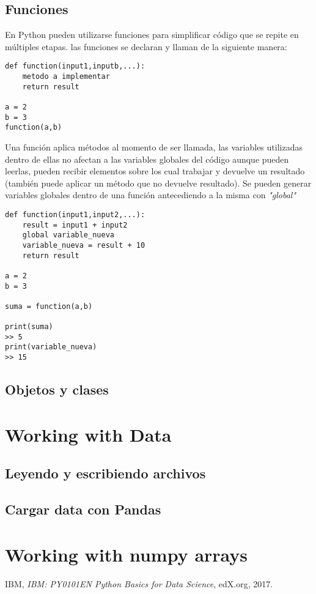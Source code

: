 \documentclass[10pt,a4paper]{article}
\begin{document}
\subsection{Funciones}
En Python pueden utilizarse funciones para simplificar código que se repite en múltiples etapas. las funciones se declaran y llaman de la siguiente manera:

\begin{lstlisting}
def function(input1,inputb,...):
    metodo a implementar
    return result

a = 2
b = 3
function(a,b)
\end{lstlisting} 

\noindent Una función aplica métodos al momento de ser llamada, las variables utilizadas dentro de ellas no afectan a las variables globales del código aunque pueden leerlas, pueden recibir elementos sobre los cual trabajar y devuelve un resultado (también puede aplicar un método que no devuelve resultado). Se pueden generar variables globales dentro de una función antecediendo a la misma con \emph{"global"}

\begin{lstlisting}
def function(input1,input2,...):
    result = input1 + input2
    global variable_nueva
    variable_nueva = result + 10    
    return result

a = 2
b = 3

suma = function(a,b)

print(suma)
>> 5
print(variable_nueva)
>> 15
\end{lstlisting} 


\subsection{Objetos y clases}
\section{Working with Data}
\subsection{Leyendo y escribiendo archivos}
\subsection{Cargar data con Pandas}
\section{Working with numpy arrays}
\begin{thebibliography}{9}
  IBM,
  \textit{ IBM: PY0101EN Python Basics for Data Science},
  edX.org,
  2017.

\end{thebibliography}
\end{document}
